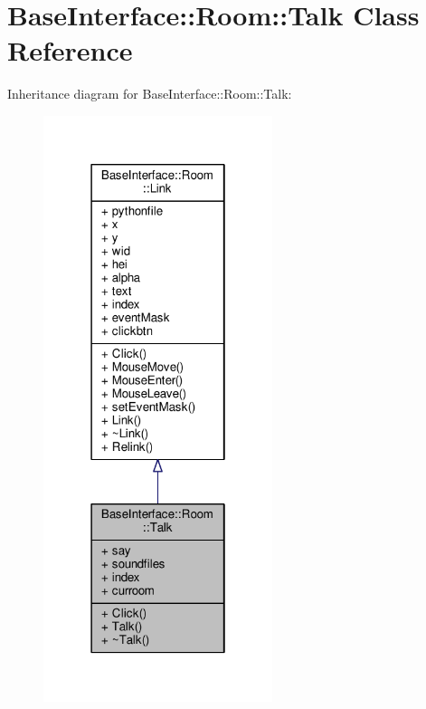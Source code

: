 \hypertarget{classBaseInterface_1_1Room_1_1Talk}{}\section{Base\+Interface\+:\+:Room\+:\+:Talk Class Reference}
\label{classBaseInterface_1_1Room_1_1Talk}


Inheritance diagram for Base\+Interface\+:\+:Room\+:\+:Talk\+:
\nopagebreak
\begin{figure}[H]
\begin{center}
\leavevmode
\includegraphics[width=190pt]{dc/d84/classBaseInterface_1_1Room_1_1Talk__inherit__graph}
\end{center}
\end{figure}


